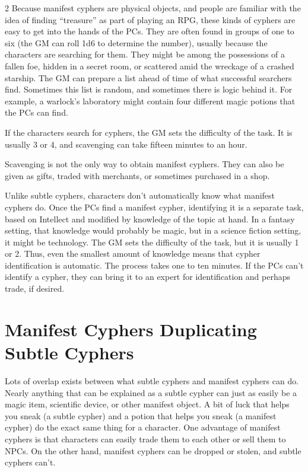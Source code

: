 \begin{multicols}{2}
Because manifest cyphers are physical objects, and people are familiar with the idea of finding “treasure” as part of playing an RPG, these kinds of cyphers are easy to get into the hands of the PCs. They are often found in groups of one to six (the GM can roll 1d6 to determine the number), usually because the characters are searching for them. They might be among the possessions of a fallen foe, hidden in a secret room, or scattered amid the wreckage of a crashed starship. The GM can prepare a list ahead of time of what successful searchers find. Sometimes this list is random, and sometimes there is logic behind it. For example, a warlock’s laboratory might contain four different magic potions that the PCs can find.

If the characters search for cyphers, the GM sets the difficulty of the task. It is usually 3 or 4, and scavenging can take fifteen minutes to an hour.

Scavenging is not the only way to obtain manifest cyphers. They can also be given as gifts, traded with merchants, or sometimes purchased in a shop.

Unlike subtle cyphers, characters don’t automatically know what manifest cyphers do. Once the PCs find a manifest cypher, identifying it is a separate task, based on Intellect and modified by knowledge of the topic at hand. In a fantasy setting, that knowledge would probably be magic, but in a science fiction setting, it might be technology. The GM sets the difficulty of the task, but it is usually 1 or 2. Thus, even the smallest amount of knowledge means that cypher identification is automatic. The process takes one to ten minutes. If the PCs can’t identify a cypher, they can bring it to an expert for identification and perhaps trade, if desired.

\section{Manifest Cyphers Duplicating Subtle Cyphers}

Lots of overlap exists between what subtle cyphers and manifest cyphers can do. Nearly anything that can be explained as a subtle cypher can just as easily be a magic item, scientific device, or other manifest object. A bit of luck that helps you sneak (a subtle cypher) and a potion that helps you sneak (a manifest cypher) do the exact same thing for a character.  One advantage of manifest cyphers is that characters can easily trade them to each other or sell them to NPCs. On the other hand, manifest cyphers can be dropped or stolen, and subtle cyphers can’t.


\end{multicols}
